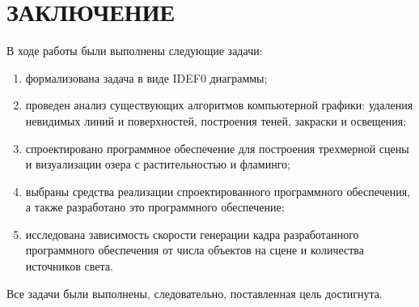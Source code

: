 \chapter*{ЗАКЛЮЧЕНИЕ}

В ходе работы были выполнены следующие задачи:
\begin{enumerate}[label=\arabic*)]
	\item формализована задача в виде IDEF0 диаграммы;
	\item проведен анализ существующих алгоритмов компьютерной графики: удаления невидимых линий и поверхностей, построения теней, закраски и освещения;
	\item спроектировано программное обеспечение для построения трехмерной сцены и визуализации озера с растительностью и фламинго;
	\item выбраны средства реализации спроектированного программного обеспечения, а также разработано это программного обеспечение;
	\item исследована зависимость скорости генерации кадра разработанного программного обеспечения от числа объектов на сцене и количества источников света.
\end{enumerate} 

Все задачи были выполнены, следовательно, поставленная цель достигнута.